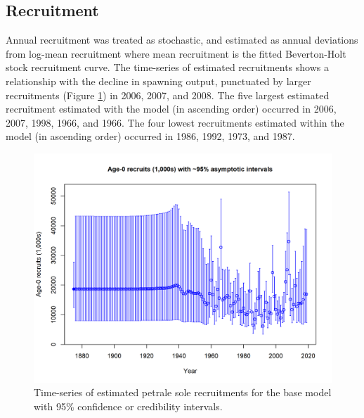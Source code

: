 \documentclass[12pt,]{article}
\begin{document}
\FloatBarrier

\subsection*{Recruitment}\label{recruitment}

Annual recruitment was treated as stochastic, and estimated as annual
deviations from log-mean recruitment where mean recruitment is the
fitted Beverton-Holt stock recruitment curve. The time-series of
estimated recruitments shows a relationship with the decline in spawning
output, punctuated by larger recruitments (Figure
\ref{fig:Recruits_all}) in 2006, 2007, and 2008. The five largest
estimated recruitment estimated with the model (in ascending order)
occurred in 2006, 2007, 1998, 1966, and 1966. The four lowest
recruitments estimated within the model (in ascending order) occurred in
1986, 1992, 1973, and 1987.

\begin{figure}
\centering
\includegraphics{r4ss/plots_mod1/ts11_Age-0_recruits_(1000s)_with_95_asymptotic_intervals.png}
\caption{Time-series of estimated petrale sole recruitments for the base
model with 95\% confidence or credibility intervals.
\label{fig:Recruits_all}}
\end{figure}
\end{document}
